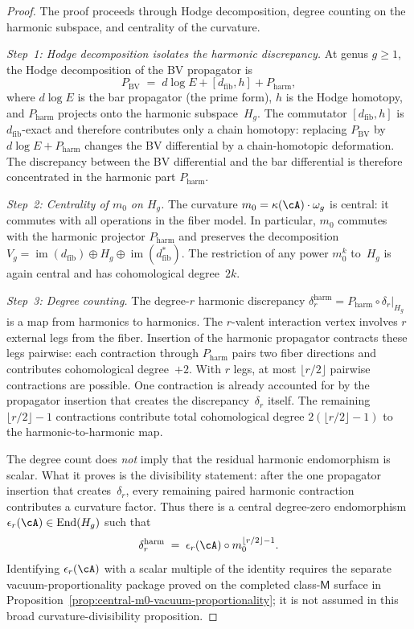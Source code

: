 \begin{proof}
The proof proceeds through Hodge decomposition, degree
counting on the harmonic subspace, and centrality of the
curvature.

\emph{Step~1: Hodge decomposition isolates the harmonic
discrepancy.}
At genus $g \geq 1$, the Hodge decomposition of the BV
propagator is
\[
P_{\mathrm{BV}}
\;=\;
d\log E + [d_{\mathrm{fib}}, h] + P_{\mathrm{harm}},
\]
where $d\log E$ is the bar propagator \textup{(}the prime
form\textup{)}, $h$ is the Hodge homotopy, and
$P_{\mathrm{harm}}$ projects onto the harmonic
subspace~$H_g$. The commutator $[d_{\mathrm{fib}}, h]$
is $d_{\mathrm{fib}}$-exact and therefore contributes
only a chain homotopy: replacing $P_{\mathrm{BV}}$ by
$d\log E + P_{\mathrm{harm}}$ changes the BV differential
by a chain-homotopic deformation. The discrepancy between
the BV differential and the bar differential is therefore
concentrated in the harmonic part $P_{\mathrm{harm}}$.

\emph{Step~2: Centrality of $m_0$ on $H_g$.}
The curvature $m_0 = \kappa(\cA) \cdot \omega_g$
is central: it commutes with all operations in the fiber
model. In particular, $m_0$ commutes with the harmonic
projector $P_{\mathrm{harm}}$ and preserves the
decomposition
$V_g = \operatorname{im}(d_{\mathrm{fib}})
\oplus H_g \oplus \operatorname{im}(d_{\mathrm{fib}}^*)$.
The restriction of any power $m_0^k$ to~$H_g$ is again
central and has cohomological degree~$2k$.

\emph{Step~3: Degree counting.}
The degree-$r$ harmonic discrepancy
$\delta_r^{\mathrm{harm}}
= P_{\mathrm{harm}} \circ \delta_r |_{H_g}$
is a map from harmonics to harmonics. The $r$-valent
interaction vertex involves $r$ external legs from the fiber.
Insertion of the harmonic propagator contracts these legs
pairwise: each contraction through $P_{\mathrm{harm}}$
pairs two fiber directions and contributes cohomological
degree~$+2$. With $r$ legs, at most
$\lfloor r/2 \rfloor$ pairwise contractions are possible.
One contraction is already accounted for by the propagator
insertion that creates the discrepancy~$\delta_r$ itself.
The remaining $\lfloor r/2 \rfloor - 1$ contractions
contribute total cohomological degree
$2(\lfloor r/2 \rfloor - 1)$ to the harmonic-to-harmonic
map.

The degree count does \emph{not} imply that the residual
harmonic endomorphism is scalar. What it proves is the
divisibility statement: after the one propagator insertion
that creates~$\delta_r$, every remaining paired harmonic
contraction contributes a curvature factor. Thus there is a
central degree-zero endomorphism
$\epsilon_r(\cA)\in\operatorname{End}(H_g)$ such that
\[
\delta_r^{\mathrm{harm}}
\;=\;
\epsilon_r(\cA)\circ m_0^{\lfloor r/2 \rfloor - 1}.
\]
Identifying $\epsilon_r(\cA)$ with a scalar multiple of the
identity requires the separate vacuum-proportionality package
proved on the completed class-$\mathsf{M}$ surface in
Proposition~\ref{prop:central-m0-vacuum-proportionality}; it is not
assumed in this broad curvature-divisibility proposition.


\end{proof}
